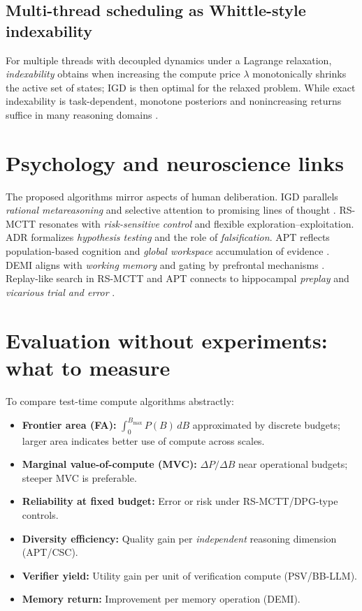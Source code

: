 \documentclass[11pt]{article}
\newcommand{\1}{\mathbb{I}}
\begin{document}
\subsection{Multi-thread scheduling as Whittle-style indexability}
For multiple threads with decoupled dynamics under a Lagrange relaxation, \emph{indexability} obtains when increasing the compute price $\lambda$ monotonically shrinks the active set of states; IGD is then optimal for the relaxed problem. While exact indexability is task-dependent, monotone posteriors and nonincreasing returns suffice in many reasoning domains \cite{liedergriffiths2020}.

\section{Psychology and neuroscience links}

The proposed algorithms mirror aspects of human deliberation. 
IGD parallels \emph{rational metareasoning} and selective attention to promising lines of thought \cite{liedergriffiths2020}. 
RS-MCTT resonates with \emph{risk-sensitive control} and flexible exploration--exploitation. 
ADR formalizes \emph{hypothesis testing} and the role of \emph{falsification}. 
APT reflects population-based cognition and \emph{global workspace} accumulation of evidence \cite{dehaene2011gnw}. 
DEMI aligns with \emph{working memory} and gating by prefrontal mechanisms \cite{baddeley1992workingmemory,gershmandaw2017}. 
Replay-like search in RS-MCTT and APT connects to hippocampal \emph{preplay} and \emph{vicarious trial and error} \cite{pfeifferfoster2013}.

\section{Evaluation without experiments: what to measure}

To compare test-time compute algorithms abstractly:

\begin{itemize}[leftmargin=1.4em, itemsep=0.25em]
\item \textbf{Frontier area (FA):} $\int_0^{B_{\max}} P(B)\, dB$ approximated by discrete budgets; larger area indicates better use of compute across scales.
\item \textbf{Marginal value-of-compute (MVC):} $\Delta P/\Delta B$ near operational budgets; steeper MVC is preferable.
\item \textbf{Reliability at fixed budget:} Error or risk under RS-MCTT/DPG-type controls.
\item \textbf{Diversity efficiency:} Quality gain per \emph{independent} reasoning dimension (APT/CSC).
\item \textbf{Verifier yield:} Utility gain per unit of verification compute (PSV/BB-LLM).
\item \textbf{Memory return:} Improvement per memory operation (DEMI).
\end{itemize}
\end{document}
